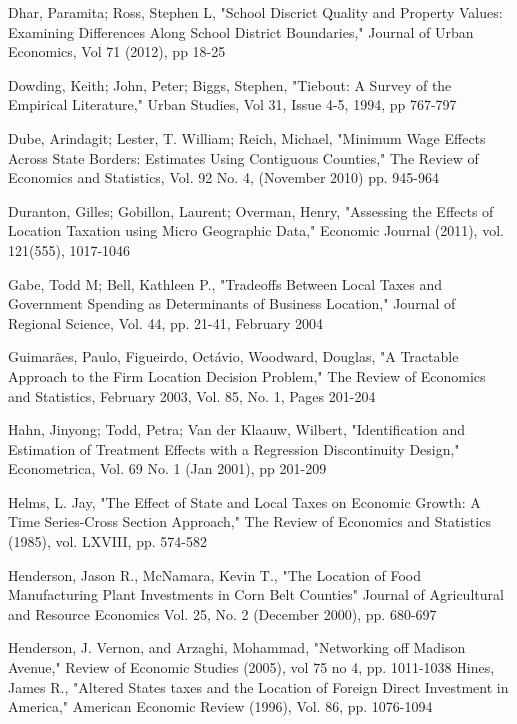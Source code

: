 \documentclass[12pt,a4paper]{article}
\begin{document}
\begin{thebibliography}{99}
Dhar, Paramita; Ross, Stephen L, "School Discrict Quality and Property Values: Examining Differences Along School District Boundaries," Journal of Urban Economics, Vol 71 (2012), pp 18-25

Dowding, Keith; John, Peter; Biggs, Stephen, "Tiebout: A Survey of the Empirical Literature," Urban Studies, Vol 31, Issue 4-5, 1994, pp 767-797

Dube, Arindagit; Lester, T. William; Reich, Michael, "Minimum Wage Effects Across State Borders: Estimates Using Contiguous Counties," The Review of Economics and Statistics, Vol. 92 No. 4, (November 2010) pp. 945-964

Duranton, Gilles; Gobillon, Laurent; Overman, Henry, "Assessing the Effects of Location Taxation using Micro Geographic Data," Economic Journal (2011), vol. 121(555), 1017-1046


Gabe, Todd M; Bell, Kathleen P., "Tradeoffs Between Local Taxes and Government Spending as Determinants of Business Location," Journal of Regional Science, Vol. 44, pp. 21-41, February 2004 

Guimarães, Paulo, Figueirdo, Octávio, Woodward, Douglas, "A Tractable Approach to the Firm Location Decision Problem," The Review of Economics and Statistics, February 2003, Vol. 85, No. 1, Pages 201-204

Hahn, Jinyong; Todd, Petra; Van der Klaauw, Wilbert, "Identification and Estimation of Treatment Effects with a Regression Discontinuity Design," Econometrica, Vol. 69 No. 1 (Jan 2001), pp 201-209

Helms, L. Jay, "The Effect of State and Local Taxes on Economic Growth: A Time Series-Cross Section Approach," The Review of Economics and Statistics (1985), vol. LXVIII, pp. 574-582

Henderson, Jason R., McNamara, Kevin T., "The Location of Food Manufacturing Plant Investments in Corn Belt Counties" Journal of Agricultural and Resource Economics Vol. 25, No. 2 (December 2000), pp. 680-697 

Henderson, J. Vernon, and Arzaghi, Mohammad, "Networking off Madison Avenue," Review of Economic Studies (2005), vol 75 no 4, pp. 1011-1038
Hines, James R., "Altered States taxes and the Location of Foreign Direct Investment in America," American Economic Review (1996), Vol. 86, pp. 1076-1094


\end{thebibliography}
\end{document}
